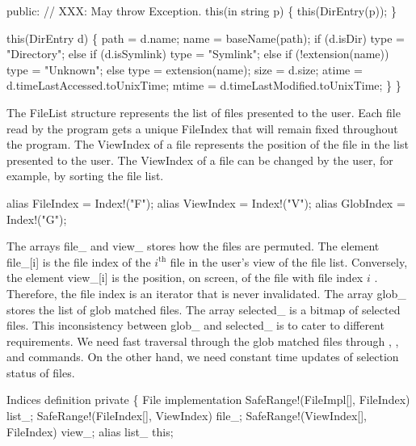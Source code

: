   public:
  // XXX: May throw Exception.
  this(in string p)
  \{
    this(DirEntry(p));
  \}

  this(DirEntry d)
  \{
    path = d.name;
    name = baseName(path);
    if (d.isDir)
      type = "Directory";
    else if (d.isSymlink)
      type = "Symlink";
    else if (!extension(name))
      type = "Unknown";
    else
      type = extension(name);
    size = d.size;
    atime = d.timeLastAccessed.toUnixTime;
    mtime = d.timeLastModified.toUnixTime;
  \}
\}

\nwendcode{}The {\Tt{}FileList\nwendquote} structure represents the list of files presented to
the user. Each file read by the program gets a unique {\Tt{}FileIndex\nwendquote}
that will remain fixed throughout the program. The {\Tt{}ViewIndex\nwendquote} of a
file represents the position of the file in the list presented to the
user. The {\Tt{}ViewIndex\nwendquote} of a file can be changed by the user, for
example, by sorting the file list.

\nwenddocs{}\endmoddef\nwstartdeflinemarkup\nwenddeflinemarkup
alias FileIndex = Index!("F");
alias ViewIndex = Index!("V");
alias GlobIndex = Index!("G");

\nwendcode{}The arrays {\Tt{}file{\_}\nwendquote} and {\Tt{}view{\_}\nwendquote} stores how the files are
permuted. The element {\Tt{}file{\_}[i]\nwendquote} is the file index of the
$i^\text{th}$ file in the user's view of the file list. Conversely,
the element {\Tt{}view{\_}[i]\nwendquote} is the position, on screen, of the file with
file index $i$ . Therefore, the file index is an iterator that is
never invalidated. The array {\Tt{}glob{\_}\nwendquote} stores the list of glob matched
files. The array {\Tt{}selected{\_}\nwendquote} is a bitmap of selected files. This
inconsistency between {\Tt{}glob{\_}\nwendquote} and {\Tt{}selected{\_}\nwendquote} is to cater to
different requirements. We need fast traversal through the glob
matched files through , , and  commands. On
the other hand, we need constant time updates of selection status of
files.

\nwenddocs{}\endmoddef\nwstartdeflinemarkup\nwenddeflinemarkup
\LA{}Indices definition\RA{}
private \{
  \LA{}File implementation\RA{}
  SafeRange!(FileImpl[],  FileIndex) list_;
  SafeRange!(FileIndex[], ViewIndex) file_;
  SafeRange!(ViewIndex[], FileIndex) view_;
  alias list_ this;

